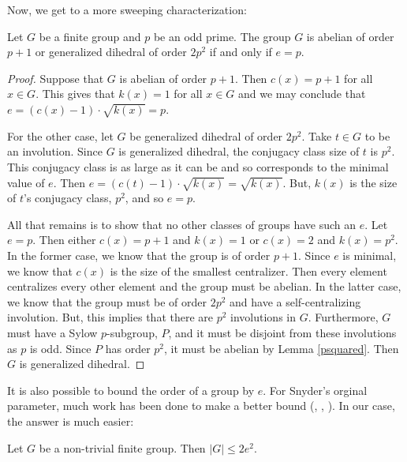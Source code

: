 \documentclass[main.tex]{subfiles}
\begin{document}
Now, we get to a more sweeping characterization:

\begin{theorem}
Let $G$ be a finite group and $p$ be an odd prime. The group $G$ is abelian of order $p+1$ or generalized dihedral of order $2p^2$ if and only if $e = p$.
\end{theorem}

\begin{proof}
Suppose that $G$ is abelian of order $p+1$. Then $c(x) = p+1$ for all $x \in G$. This gives that $k(x) = 1$ for all $x \in G$ and we may conclude that $e = (c(x) - 1) \cdot \sqrt{k(x)} = p$.

For the other case, let $G$ be generalized dihedral of order $2p^2$. Take $t \in G$ to be an involution. Since $G$ is generalized dihedral, the conjugacy class size of $t$ is $p^2$. This conjugacy class is as large as it can be and so corresponds to the minimal value of $e$. Then $e = (c(t) - 1) \cdot \sqrt{k(x)} = \sqrt{k(x)}$. But, $k(x)$ is the size of $t$'s conjugacy class, $p^2$, and so $e = p$.

All that remains is to show that no other classes of groups have such an $e$. Let $e = p$. Then either $c(x) = p+1$ and $k(x) = 1$ or $c(x) = 2$ and $k(x) = p^2$. In the former case, we know that the group is of order $p+1$. Since $e$ is minimal, we know that $c(x)$ is the size of the smallest centralizer. Then every element centralizes every other element and the group must be abelian. In the latter case, we know that the group must be of order $2p^2$ and have a self-centralizing involution. But, this implies that there are $p^2$ involutions in $G$. Furthermore, $G$ must have a Sylow $p$-subgroup, $P$, and it must be disjoint from these involutions as $p$ is odd. Since $P$ has order $p^2$, it must be abelian by Lemma \ref{psquared}. Then $G$ is generalized dihedral.
\end{proof}

It is also possible to bound the order of a group by $e$. For Snyder's orginal parameter, much work has been done to make a better bound (\cite{isaacsarticle}, \cite{durfeejensenarticle}, \cite{lewisarticle}). In our case, the answer is much easier:

\begin{theorem}\label{ebound}
Let $G$ be a non-trivial finite group. Then $|G| \le 2e^2$.
\end{theorem}
\end{document}
